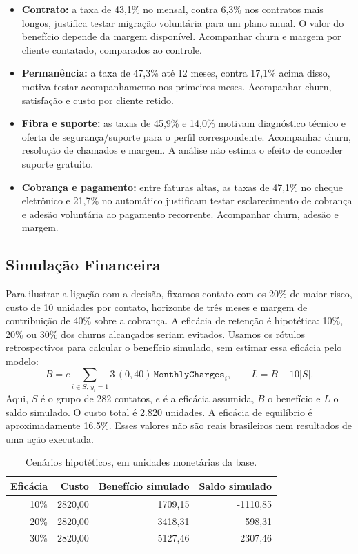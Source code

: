\documentclass[12pt]{article}
\begin{document}
\begin{itemize}
\item \textbf{Contrato:} a taxa de 43,1\% no mensal, contra 6,3\% nos contratos mais longos, justifica testar migração voluntária para um plano anual. O valor do benefício depende da margem disponível. Acompanhar churn e margem por cliente contatado, comparados ao controle.
\item \textbf{Permanência:} a taxa de 47,3\% até 12 meses, contra 17,1\% acima disso, motiva testar acompanhamento nos primeiros meses. Acompanhar churn, satisfação e custo por cliente retido.
\item \textbf{Fibra e suporte:} as taxas de 45,9\% e 14,0\% motivam diagnóstico técnico e oferta de segurança/suporte para o perfil correspondente. Acompanhar churn, resolução de chamados e margem. A análise não estima o efeito de conceder suporte gratuito.
\item \textbf{Cobrança e pagamento:} entre faturas altas, as taxas de 47,1\% no cheque eletrônico e 21,7\% no automático justificam testar esclarecimento de cobrança e adesão voluntária ao pagamento recorrente. Acompanhar churn, adesão e margem.
\end{itemize}

\subsection{Simulação Financeira}
Para ilustrar a ligação com a decisão, fixamos contato com os 20\% de maior risco, custo de 10 unidades por contato, horizonte de três meses e margem de contribuição de 40\% sobre a cobrança. A eficácia de retenção é hipotética: 10\%, 20\% ou 30\% dos churns alcançados seriam evitados. Usamos os rótulos retrospectivos para calcular o benefício simulado, sem estimar essa eficácia pelo modelo:
\[
 B=e\sum_{i\in S,\,y_i=1}3\,(0{,}40)\,\texttt{MonthlyCharges}_i,
 \qquad L=B-10|S|.
\]
Aqui, $S$ é o grupo de 282 contatos, $e$ é a eficácia assumida, $B$ o benefício e $L$ o saldo simulado. O custo total é 2.820 unidades. A eficácia de equilíbrio é aproximadamente 16,5\%. Esses valores não são reais brasileiros nem resultados de uma ação executada.

\begin{table}[htbp]
\centering\small
\caption{Cenários hipotéticos, em unidades monetárias da base.}
\label{tab:financeiro}
\begin{tabular}{rrrr}\toprule
Eficácia & Custo & Benefício simulado & Saldo simulado\\\midrule
10\% & 2820,00 & 1709,15 & -1110,85 \\
20\% & 2820,00 & 3418,31 & 598,31 \\
30\% & 2820,00 & 5127,46 & 2307,46 \\
\bottomrule\end{tabular}
\end{table}
\end{document}
